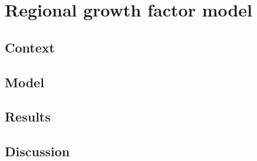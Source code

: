 \section{Regional growth factor model}%
\label{sec:regional_growth_factor_model}

\subsection{Context}

% 

\subsection{Model}

\subsection{Results}

\subsection{Discussion}

